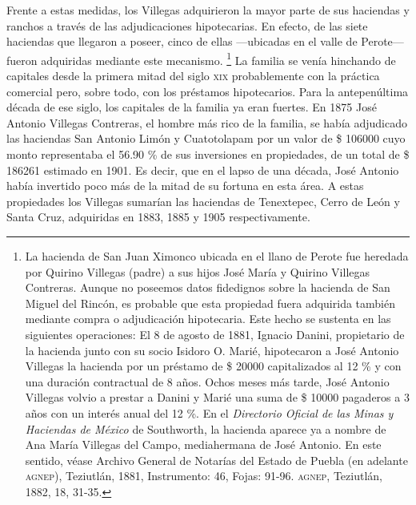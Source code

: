 \documentclass[14pt,twoside,final]{extbook} %
\let\oldfootnote\footnote
\renewcommand\footnote[1]{%
\oldfootnote{\hspace{1mm}#1}}
\begin{document}
Frente a estas medidas, los Villegas adquirieron la mayor parte de sus haciendas y ranchos a través de las adjudicaciones hipotecarias. En efecto, de las siete haciendas que llegaron a poseer, cinco de ellas ---ubicadas en el valle de Perote--- fueron adquiridas mediante este mecanismo.\footnote{La hacienda de San Juan Ximonco ubicada en el llano de Perote fue heredada por Quirino Villegas
(padre) a sus hijos José María y Quirino Villegas Contreras. Aunque no poseemos datos fidedignos
sobre la hacienda de San Miguel del Rincón, es probable que esta propiedad fuera adquirida también
mediante compra o adjudicación hipotecaria. Este hecho se sustenta en las siguientes operaciones:
El 8 de agosto de 1881, Ignacio Danini, propietario de la hacienda junto con su socio Isidoro O.
Marié, hipotecaron a José Antonio Villegas la hacienda por un préstamo de \$ 20000
capitalizados al 12 \% y con una duración contractual de 8 años. Ochos meses más tarde, José
Antonio Villegas volvio a prestar a Danini y Marié una suma de \$ 10000 pagaderos a 3 años
con un interés anual del 12 \%. En el \emph{Directorio Oficial de las Minas y Haciendas de México} de Southworth, la hacienda aparece ya a nombre de Ana María Villegas del Campo, mediahermana de José Antonio. En este sentido, véase Archivo General de Notarías del Estado de Puebla (en adelante \textsc{agnep}), Teziutlán, 1881, Instrumento: 46, Fojas: 91-96. \textsc{agnep}, Teziutlán, 1882, 18, 31-35.} La familia se venía hinchando de capitales desde la primera mitad del siglo \textsc{xix} probablemente con la práctica comercial pero, sobre todo, con los préstamos hipotecarios. Para la antepenúltima década de ese siglo, los capitales de la familia ya eran fuertes. En 1875 José Antonio Villegas Contreras, el hombre más rico de la familia, se había adjudicado las haciendas San Antonio Limón y Cuatotolapam por un valor de \$ 106000 cuyo monto representaba el 56.90 \% de sus inversiones en propiedades, de un total de \$ 186261 estimado en 1901. Es decir, que en el lapso de una década, José Antonio había invertido poco más de la mitad de su fortuna en esta área. A estas propiedades los Villegas sumarían las haciendas de Tenextepec, Cerro de León y Santa Cruz, adquiridas en 1883, 1885 y 1905 respectivamente.
\end{document}

